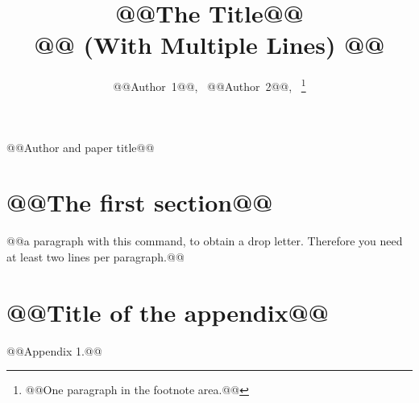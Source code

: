 \documentclass[12pt,journal,compsoc]{IEEEtran}
\begin{document}
\title{@@The Title@@ \\ @@ (With Multiple Lines) @@}

%
\author{%
%
@@Author~1@@,~
@@Author~2@@,~%
%
%
\thanks{@@One paragraph in the footnote area.@@}
%
}

%
{@@Author and paper title@@}


\maketitle%
\IEEEdisplaynotcompsoctitleabstractindextext%

\section{@@The first section@@}

 @@a paragraph with this command, to obtain a drop 
letter.
Therefore you need at least two lines per paragraph.@@

\appendices%
\section{@@Title of the appendix@@}
@@Appendix 1.@@
\end{document}
